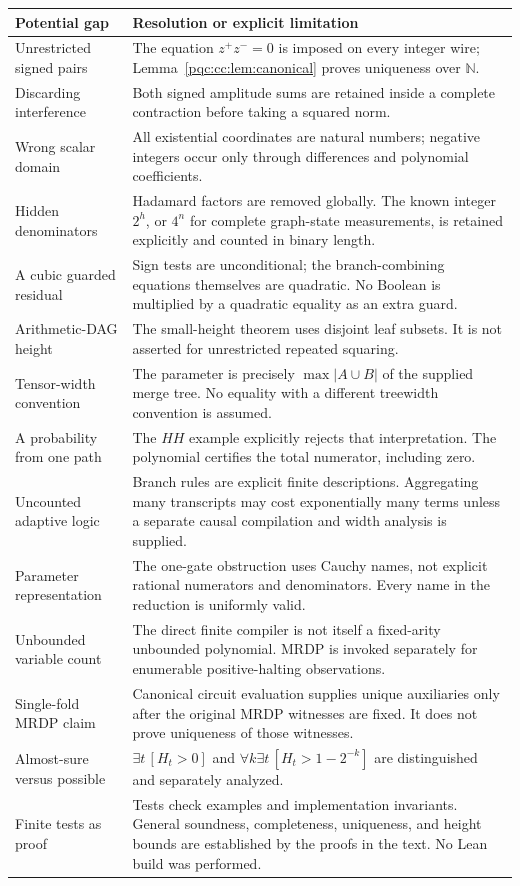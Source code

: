 \documentclass[11pt,letterpaper]{article}
\numberwithin{equation}{section}
\theoremstyle{definition}
\theoremstyle{remark}
\newcommand{\N}{\mathbb N}
\begin{document}
\begin{longtable}{@{}p{1.6in}p{4.6in}@{}}
\toprule
Potential gap & Resolution or explicit limitation\\
\midrule
\endhead
Unrestricted signed pairs & The equation $z^+z^-=0$ is imposed on every
integer wire; Lemma~\ref{pqc:cc:lem:canonical} proves uniqueness over $\N$.\\[0.5em]
Discarding interference & Both signed amplitude sums are retained inside a
complete contraction before taking a squared norm.\\[0.5em]
Wrong scalar domain & All existential coordinates are natural numbers;
negative integers occur only through differences and polynomial coefficients.\\[0.5em]
Hidden denominators & Hadamard factors are removed globally. The known
integer $2^h$, or $4^n$ for complete graph-state measurements, is retained
explicitly and counted in binary length.\\[0.5em]
A cubic guarded residual & Sign tests are unconditional; the branch-combining
equations themselves are quadratic. No Boolean is multiplied by a quadratic
equality as an extra guard.\\[0.5em]
Arithmetic-DAG height & The small-height theorem uses disjoint leaf subsets.
It is not asserted for unrestricted repeated squaring.\\[0.5em]
Tensor-width convention & The parameter is precisely $\max|A\cup B|$ of the
supplied merge tree. No equality with a different treewidth convention is
assumed.\\[0.5em]
A probability from one path & The $HH$ example explicitly rejects that
interpretation. The polynomial certifies the total numerator, including zero.\\[0.5em]
Uncounted adaptive logic & Branch rules are explicit finite descriptions.
Aggregating many transcripts may cost exponentially many terms unless a
separate causal compilation and width analysis is supplied.\\[0.5em]
Parameter representation & The one-gate obstruction uses Cauchy names,
not explicit rational numerators and denominators. Every name in the reduction
is uniformly valid.\\[0.5em]
Unbounded variable count & The direct finite compiler is not itself a
fixed-arity unbounded polynomial. MRDP is invoked separately for enumerable
positive-halting observations.\\[0.5em]
Single-fold MRDP claim & Canonical circuit evaluation supplies unique
auxiliaries only after the original MRDP witnesses are fixed. It does not
prove uniqueness of those witnesses.\\[0.5em]
Almost-sure versus possible & $\exists t\,[H_t>0]$ and
$\forall k\exists t\,[H_t>1-2^{-k}]$ are distinguished and separately analyzed.\\[0.5em]
Finite tests as proof & Tests check examples and implementation invariants.
General soundness, completeness, uniqueness, and height bounds are established
by the proofs in the text. No Lean build was performed.\\
\bottomrule
\end{longtable}
\end{document}
